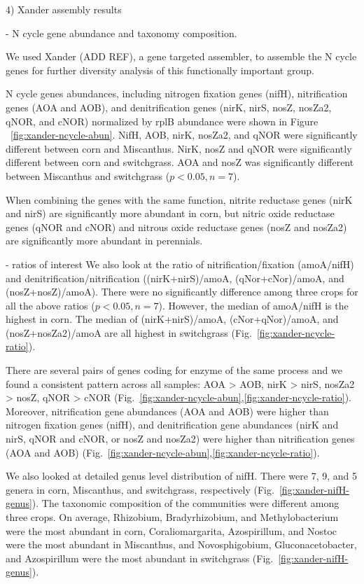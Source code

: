\documentclass[12pt]{article}
\begin{document}
4) Xander assembly results

- N cycle gene abundance and taxonomy composition.

We used Xander (ADD REF), a gene targeted assembler, to assemble the N cycle genes for further diversity analysis of this functionally important group.

N cycle genes abundances, including nitrogen fixation genes (nifH), nitrification genes (AOA and AOB), and denitrification genes (nirK, nirS, nosZ, nosZa2, qNOR, and cNOR) normalized by rplB abundance were shown in Figure ~\ref{fig:xander-ncycle-abun}. NifH, AOB, nirK, nosZa2, and qNOR were significantly different between corn and Miscanthus. NirK, nosZ and qNOR  were significantly different between corn and switchgrass. AOA and nosZ was significantly different between Miscanthus and switchgrass ($p < 0.05, n = 7$).

When combining the genes with the same function, nitrite reductase genes (nirK and nirS) are significantly more abundant in corn, but nitric oxide reductase genes (qNOR and cNOR) and nitrous oxide reductase genes (nosZ and nosZa2) are significantly more abundant in perennials.

- ratios of interest
We also look at the ratio of nitrification/fixation (amoA/nifH) and denitrification/nitrification ((nirK+nirS)/amoA, (qNor+cNor)/amoA, and (nosZ+nosZ)/amoA). There were no significantly difference among three crops for all the above ratios ($p < 0.05, n = 7$). However, the median of amoA/nifH is the highest in corn. The median of (nirK+nirS)/amoA, (cNor+qNor)/amoA, and (nosZ+nosZa2)/amoA are all highest in switchgrass (Fig.~\ref{fig:xander-ncycle-ratio}).

There are several pairs of genes coding for enzyme of the same process and we found a consistent pattern across all samples: AOA {\textgreater} AOB, nirK {\textgreater} nirS, nosZa2 {\textgreater} nosZ, qNOR {\textgreater} cNOR (Fig.~\ref{fig:xander-ncycle-abun},\ref{fig:xander-ncycle-ratio}). Moreover, nitrification gene abundances (AOA and AOB) were higher than nitrogen fixation genes (nifH), and denitrification gene abundances (nirK and nirS, qNOR and cNOR, or nosZ and nosZa2) were higher than nitrification genes (AOA and AOB) (Fig.~\ref{fig:xander-ncycle-abun},\ref{fig:xander-ncycle-ratio}).

We also looked at detailed genus level distribution of nifH. There were 7, 9, and 5 genera in corn, Miscanthus, and switchgrass, respectively (Fig.~\ref{fig:xander-nifH-genus}). The taxonomic composition of the communities were different among three crops. On average, Rhizobium, Bradyrhizobium, and Methylobacterium were the most abundant in corn, Coraliomargarita, Azospirillum, and Nostoc were the most abundant in Miscanthus, and Novosphigobium, Gluconacetobacter, and Azospirillum were the most abundant in switchgrass (Fig.~\ref{fig:xander-nifH-genus}).
\end{document}
